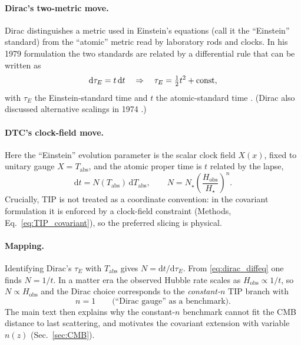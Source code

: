\documentclass[12pt]{article}
\newcommand{\Tabs}{T_{\mathrm{abs}}}
\newcommand{\Hobs}{H_{\mathrm{obs}}}
\newcommand{\dd}{\mathrm{d}}
\begin{document}
\paragraph{Dirac's two-metric move.}
Dirac distinguishes a metric used in Einstein's equations (call it the ``Einstein'' standard)
from the ``atomic'' metric read by laboratory rods and clocks. In his 1979 formulation the
two standards are related by a differential rule that can be written as
\begin{equation}
\dd\tau_E = t\,\dd t
\quad\Rightarrow\quad
\tau_E=\tfrac{1}{2}t^{2}+{\rm const},
\label{eq:dirac_diffeq}
\end{equation}
with $\tau_E$ the Einstein-standard time and $t$ the atomic-standard time \citep{Dirac1979}.
(Dirac also discussed alternative scalings in 1974 \citep{Dirac1974}.)

\paragraph{DTC's clock-field move.}
Here the ``Einstein'' evolution parameter is the scalar clock field $X(x)$, fixed to unitary gauge
$X=\Tabs$, and the atomic proper time is $t$ related by the lapse,
\begin{equation}
\dd t = N(\Tabs)\,\dd\Tabs,
\qquad
N = N_{\star}\!\left(\frac{\Hobs}{H_{\star}}\right)^{n}.
\label{eq:dt_tip_app}
\end{equation}
Crucially, TIP is not treated as a coordinate convention: in the covariant formulation it is enforced by
a clock-field constraint (Methods, Eq.~\eqref{eq:TIP_covariant}), so the preferred slicing is physical.

\paragraph{Mapping.}
Identifying Dirac's $\tau_E$ with $\Tabs$ gives $N=\dd t/\dd\tau_E$.
From \eqref{eq:dirac_diffeq} one finds $N=1/t$. In a matter era the observed Hubble rate scales as
$\Hobs\propto 1/t$, so $N\propto \Hobs$ and the Dirac choice corresponds to the \emph{constant-$n$}
TIP branch with
\begin{equation}
n=1\qquad\text{(``Dirac gauge'' as a benchmark).}
\label{eq:dirac_gauge}
\end{equation}
The main text then explains why the constant-$n$ benchmark cannot fit the CMB distance to last scattering,
and motivates the covariant extension with variable $n(z)$ (Sec.~\ref{sec:CMB}).
\end{document}
